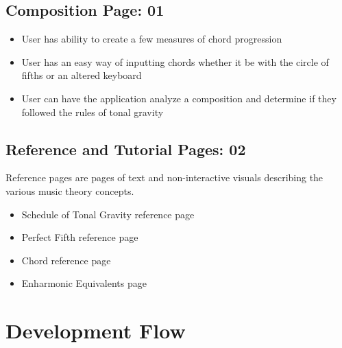 \documentclass[onecolumn, draftclsnofoot,10pt, compsoc]{IEEEtran}
\begin{document}
\subsection{Composition Page: 01}
\begin{itemize}
\item User has ability to create a few measures of chord progression
\item User has an easy way of inputting chords whether it be with the circle of fifths or an altered keyboard
\item User can have the application analyze a composition and determine if they followed the rules of tonal gravity
\end{itemize}

\pagebreak
\subsection{Reference and Tutorial Pages: 02}
Reference pages are pages of text and non-interactive visuals describing the various music theory concepts.
\begin{itemize}
\item Schedule of Tonal Gravity reference page
\item Perfect Fifth reference page 
\item Chord reference page
\item Enharmonic Equivalents page
\end{itemize}

\section{Development Flow}
\begin{ganttchart}{1}{15}
     \\

     \\
     \\
     \\

     \\
     \\
     \\

\end{ganttchart}
\end{document}

